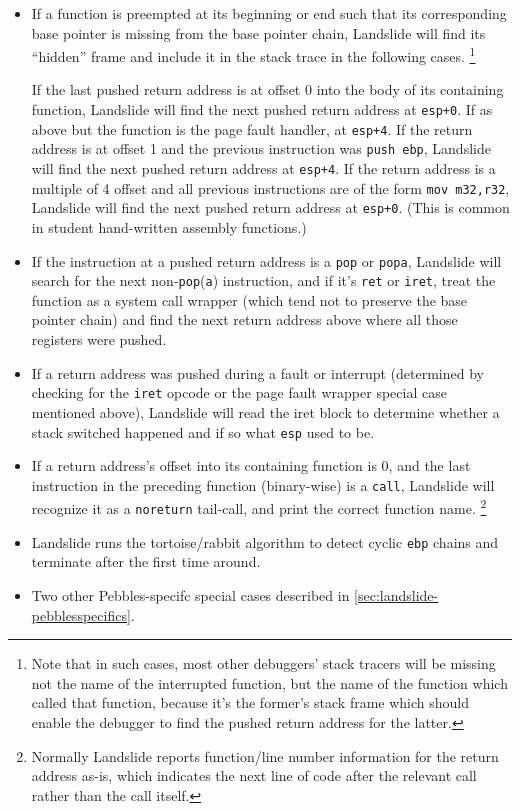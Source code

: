 \begin{itemize}
	\item If a function is preempted at its beginning or end
		such that its corresponding base pointer is missing from the base pointer chain,
		Landslide will find its ``hidden'' frame and include it in the stack trace in the following cases.%
		\footnote{Note that in such cases,
		most other debuggers' stack tracers will be missing not the name of the interrupted function,
		but the name of the function which called that function,
		because it's the former's stack frame which should enable the debugger
		to find the pushed return address for the latter.}
		\begin{itemize}
			\llitem If the last pushed return address is at offset 0 into the body of its containing function,
				Landslide will find the next pushed return address at {\tt esp+0}.
			\llitem If as above but the function is the page fault handler, at {\tt esp+4}.
			\llitem If the return address is at offset 1 and the previous instruction was {\tt push ebp},
				Landslide will find the next pushed return address at {\tt esp+4}.
			\llitem If the return address is a multiple of 4 offset
				and all previous instructions are of the form {\tt mov m32,r32},
				Landslide will find the next pushed return address at {\tt esp+0}.
				(This is common in student hand-written assembly functions.)
		\end{itemize}
	\item If the instruction at a pushed return address is a {\tt pop} or {\tt popa},
		Landslide will search for the next non-{\tt pop}({\tt a}) instruction,
		and if it's {\tt ret} or {\tt iret},
		treat the function as a system call wrapper
		(which tend not to preserve the base pointer chain)
		and find the next return address above where all those registers were pushed.
	\item If a return address was pushed during a fault or interrupt
		(determined by checking for the {\tt iret} opcode or the page fault wrapper special case mentioned above),
		Landslide will read the iret block to determine whether a stack switched happened
		and if so what {\tt esp} used to be.
	\item If a return address's offset into its containing function is 0,
		and the last instruction in the preceding function (binary-wise) is a {\tt call},
		Landslide will recognize it as a {\tt noreturn} tail-call, and print the correct function name.%
		\footnote{Normally Landslide reports function/line number information for the return address as-is,
		which indicates the next line of code after the relevant call rather than the call itself.}
	\item Landslide runs the tortoise/rabbit algorithm to detect cyclic {\tt ebp} chains and terminate after the first time around.
	\item Two other Pebbles-specifc special cases described in \cref{sec:landslide-pebblesspecifics}.
\end{itemize}

